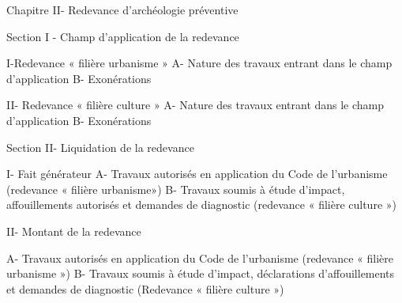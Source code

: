 Chapitre II- Redevance d'archéologie préventive

Section I - Champ d'application de la redevance

I-Redevance « filière urbanisme »
A- Nature des travaux entrant dans le champ d’application
B- Exonérations 

II- Redevance « filière culture »
A- Nature des travaux entrant dans le champ d’application
B- Exonérations

Section II- Liquidation de la redevance

I- Fait générateur
A- Travaux autorisés en application du Code de l'urbanisme (redevance « filière urbanisme»)
B- Travaux soumis à étude d'impact, affouillements autorisés et demandes de diagnostic (redevance « filière culture »)

II- Montant de la redevance

A- Travaux autorisés en application du Code de l'urbanisme (redevance « filière urbanisme »)
B- Travaux soumis à étude d'impact, déclarations d'affouillements et demandes de diagnostic (Redevance « filière culture »)
